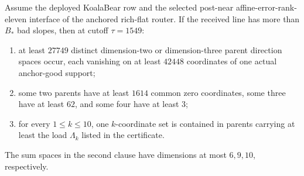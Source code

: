 
\begin{theorem}
Assume the deployed KoalaBear row and the selected post-near
affine-error-rank-eleven interface of the anchored rich-flat router.  If the
received line has more than \(B_*\) bad slopes, then at cutoff
\(\tau=1549\):

\begin{enumerate}
\item at least \(27749\) distinct dimension-two or dimension-three parent
direction spaces occur, each vanishing on at least \(42448\) coordinates of
one actual anchor-good support;
\item some two parents have at least \(1614\) common zero coordinates, some
three have at least \(62\), and some four have at least \(3\);
\item for every \(1\le k\le10\), one \(k\)-coordinate set is contained in
parents carrying at least the load \(\Lambda_k\) listed in the certificate.
\end{enumerate}

The sum spaces in the second clause have dimensions at most \(6,9,10\),
respectively.
\end{theorem}
